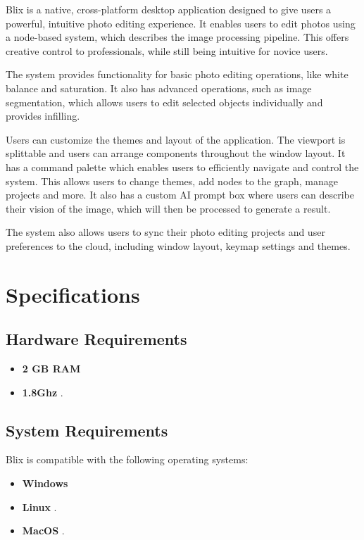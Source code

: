 \documentclass[11pt,a4paper]{article}
\begin{document}
Blix is a native, cross-platform desktop application designed to give users a
powerful, intuitive photo editing experience. It enables users to edit photos 
using a node-based system, which describes the image processing pipeline. This
offers creative control to professionals, while still being intuitive for 
novice users.

The system provides functionality for basic photo editing operations, like white
balance and saturation. It also has advanced operations, such as image
segmentation, which allows users to edit selected objects individually and
provides infilling. 

Users can customize the themes and layout of the application. The viewport is
splittable and users can arrange components throughout the window layout. It has
a command palette which enables users to efficiently navigate and control the
system. This allows users to change themes, add nodes to the graph, manage
projects and more. It also has a custom AI prompt box where users can describe
their vision of the image, which will then be processed to generate a result.

The system also allows users to sync their photo editing projects and user
preferences to the cloud, including window layout, keymap settings and themes.

\pagebreak


\section*{Specifications}

\subsection*{Hardware Requirements}
\begin{itemize}
  \item[\textbullet] \textbf{2 GB RAM}
  \item[\textbullet] \textbf{1.8Ghz }.

\end{itemize}

\subsection*{System Requirements}

Blix is compatible with the following operating systems:
\begin{itemize}
  \item[\textbullet] \textbf{Windows}
  \item[\textbullet] \textbf{Linux }.
  \item[\textbullet] \textbf{MacOS }.
\end{itemize}
\end{document}
